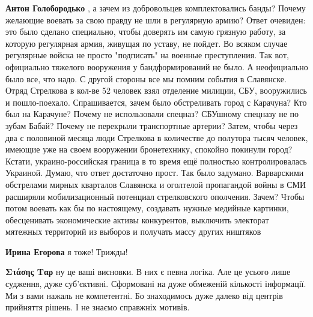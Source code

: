 \begin{itemize}
\begin{itemize}
\textbf{Антон Голобородько} , а зачем из добровольцев комплектовались банды?
Почему желающие воевать за свою правду не шли в регулярную армию? Ответ
очевиден: это было сделано специально, чтобы доверять им самую грязную работу,
за которую регулярная армия, живущая по уставу, не пойдет. Во всяком случае
регулярные войска не просто "подписать" на военные преступления. Так вот,
официально тяжелого вооружения у бандформирований не было. А неофициально было
все, что надо. С другой стороны все мы помним события в Славянске. Отряд
Стрелкова в кол-ве 52 человек взял отделение милиции, СБУ, вооружились и
пошло-поехало. Спрашивается, зачем было обстреливать город с Карачуна? Кто был
на Карачуне? Почему не использовали спецназ? СБУшному спецназу не по зубам
Бабай? Почему не перекрыли транспортные артерии? Затем, чтобы через два с
половиной месяца люди Стрелкова в количестве до полутора тысяч человек, имеющие
уже на своем вооружении бронетехнику, спокойно покинули город? Кстати,
украино-российская граница в то время ещё полностью контролировалась Украиной.
Думаю, что ответ достаточно прост. Так было задумано. Варварскими обстрелами
мирных кварталов Славянска и оголтелой пропагандой войны в СМИ расширяли
мобилизационный потенциал стрелковского ополчения. Зачем? Чтобы потом воевать
как бы по настоящему, создавать нужные медийные картинки, обесценивать
экономические активы конкурентов, выключить электорат мятежных территорий из
выборов и получать массу других ништяков

 
\textbf{Ирина Егорова} я тоже! Трижды!

 
\textbf{Στάσης Ταρ} ну це ваші висновки. В них є певна логіка. Але це усього
лише судження, дуже суб’єктивні. Сформовані на дуже обмеженій кількості
інформації. Ми з вами нажаль не компетентні. Бо знаходимось дуже далеко від
центрів прийняття рішень. І не знаємо справжніх мотивів.

 

\end{itemize}
\end{itemize}
